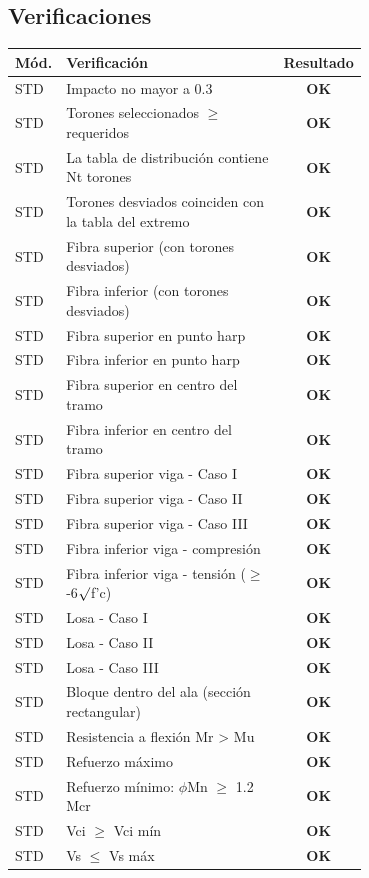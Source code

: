 \documentclass[10pt,a4paper]{article}
\newcommand{\ok}[1]{\textcolor{verde}{\textbf{#1}}}
\newcommand{\nota}[1]{\par\noindent{\small\itshape\textcolor{black!70}{#1}}\par\smallskip}
\begin{document}
\subsection*{Verificaciones}
\nota{Total de verificaciones: 116; no cumplen: 2.}
\begin{longtable}{@{}l p{0.7\linewidth} c@{}}
\toprule
\textbf{Mód.} & \textbf{Verificación} & \textbf{Resultado}\\
\midrule
\endhead
STD & Impacto no mayor a 0.3 & \ok{OK} \\
STD & Torones seleccionados $\ge$ requeridos & \ok{OK} \\
STD & La tabla de distribución contiene Nt torones & \ok{OK} \\
STD & Torones desviados coinciden con la tabla del extremo & \ok{OK} \\
STD & Fibra superior (con torones desviados) & \ok{OK} \\
STD & Fibra inferior (con torones desviados) & \ok{OK} \\
STD & Fibra superior en punto harp & \ok{OK} \\
STD & Fibra inferior en punto harp & \ok{OK} \\
STD & Fibra superior en centro del tramo & \ok{OK} \\
STD & Fibra inferior en centro del tramo & \ok{OK} \\
STD & Fibra superior viga - Caso I & \ok{OK} \\
STD & Fibra superior viga - Caso II & \ok{OK} \\
STD & Fibra superior viga - Caso III & \ok{OK} \\
STD & Fibra inferior viga - compresión & \ok{OK} \\
STD & Fibra inferior viga - tensión ($\ge$ -6$\surd$f'c) & \ok{OK} \\
STD & Losa - Caso I & \ok{OK} \\
STD & Losa - Caso II & \ok{OK} \\
STD & Losa - Caso III & \ok{OK} \\
STD & Bloque dentro del ala (sección rectangular) & \ok{OK} \\
STD & Resistencia a flexión Mr > Mu & \ok{OK} \\
STD & Refuerzo máximo & \ok{OK} \\
STD & Refuerzo mínimo: $\phi$Mn $\ge$ 1.2 Mcr & \ok{OK} \\
STD & Vci $\ge$ Vci mín & \ok{OK} \\
STD & Vs $\le$ Vs máx & \ok{OK} \\

\end{longtable}
\end{document}
